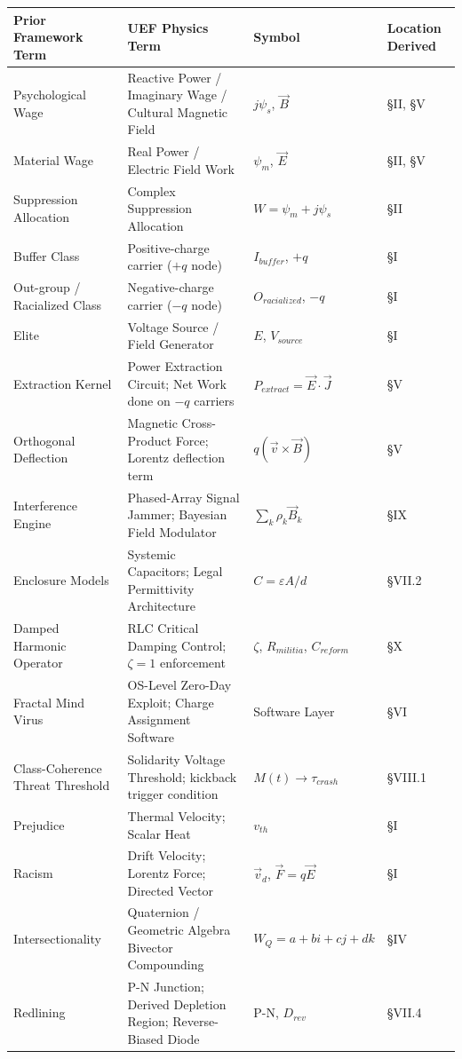 \documentclass[12pt]{book}
\numberwithin{equation}{chapter}
\begin{document}
\begin{center}
\begin{tabular}{llll}
\toprule
Prior Framework Term & UEF Physics Term & Symbol & Location Derived  \\
\midrule
Psychological Wage & Reactive Power / Imaginary Wage / Cultural Magnetic Field & $j\psi_s$, $\vec{B}$ & §II, §V  \\
Material Wage & Real Power / Electric Field Work & $\psi_m$, $\vec{E}$ & §II, §V  \\
Suppression Allocation & Complex Suppression Allocation & $W = \psi_m + j\psi_s$ & §II  \\
Buffer Class & Positive-charge carrier ($+q$ node) & $I_{buffer}$, $+q$ & §I  \\
Out-group / Racialized Class & Negative-charge carrier ($-q$ node) & $O_{racialized}$, $-q$ & §I  \\
Elite & Voltage Source / Field Generator & $E$, $V_{source}$ & §I  \\
Extraction Kernel & Power Extraction Circuit; Net Work done on $-q$ carriers & $P_{extract} = \vec{E} \cdot \vec{J}$ & §V  \\
Orthogonal Deflection & Magnetic Cross-Product Force; Lorentz deflection term & $q(\vec{v} \times \vec{B})$ & §V  \\
Interference Engine & Phased-Array Signal Jammer; Bayesian Field Modulator & $\sum_k \rho_k \vec{B}_k$ & §IX  \\
Enclosure Models & Systemic Capacitors; Legal Permittivity Architecture & $C = \varepsilon A / d$ & §VII.2  \\
Damped Harmonic Operator & RLC Critical Damping Control; $\zeta = 1$ enforcement & $\zeta$, $R_{militia}$, $C_{reform}$ & §X  \\
Fractal Mind Virus & OS-Level Zero-Day Exploit; Charge Assignment Software & Software Layer & §VI  \\
Class-Coherence Threat Threshold & Solidarity Voltage Threshold; kickback trigger condition & $M(t) \to \tau_{crash}$ & §VIII.1  \\
Prejudice & Thermal Velocity; Scalar Heat & $v_{th}$ & §I  \\
Racism & Drift Velocity; Lorentz Force; Directed Vector & $\vec{v}_d$, $\vec{F} = q\vec{E}$ & §I  \\
Intersectionality & Quaternion / Geometric Algebra Bivector Compounding & $W_Q = a + bi + cj + dk$ & §IV  \\
Redlining & P-N Junction; Derived Depletion Region; Reverse-Biased Diode & P-N, $D_{rev}$ & §VII.4  \\

\end{tabular}
\end{center}
\end{document}
